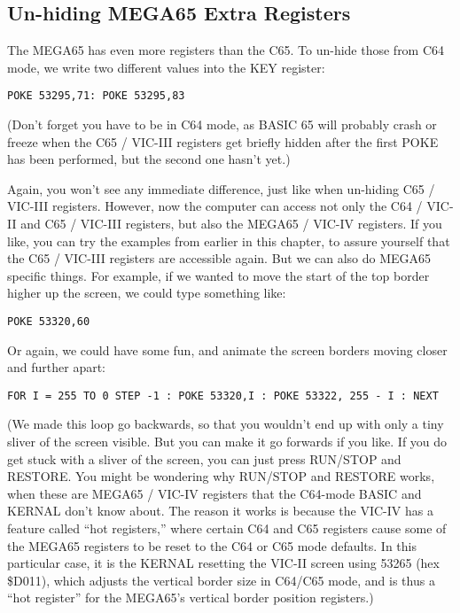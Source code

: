 \subsection{Un-hiding MEGA65 Extra Registers}

The MEGA65 has even more registers than the C65.  To un-hide those from C64 mode, we write two different values into the KEY register:

\begin{tcolorbox}[colback=black,coltext=white]
\verbatimfont{\codefont}
\begin{verbatim}
POKE 53295,71: POKE 53295,83
\end{verbatim}
\end{tcolorbox}

(Don't forget you have to be in C64 mode, as BASIC 65 will probably crash or freeze when the C65 / VIC-III registers get briefly
hidden after the first POKE has been performed, but the second one hasn't yet.)

Again, you won't see any immediate difference, just like when un-hiding C65 / VIC-III registers.  However, now the computer
can access not only the C64 / VIC-II and C65 / VIC-III registers, but also the MEGA65 / VIC-IV registers.  If you like,
you can try the examples from earlier in this chapter, to assure yourself that the C65 / VIC-III registers are accessible again.
But we can also do MEGA65 specific things. For example, if we wanted to move
the start of the top border higher up the screen, we could type something like:

\begin{tcolorbox}[colback=black,coltext=white]
\verbatimfont{\codefont}
\begin{verbatim}
POKE 53320,60
\end{verbatim}
\end{tcolorbox}

Or again, we could have some fun, and animate the screen borders moving closer and further apart:

\begin{tcolorbox}[colback=black,coltext=white]
\verbatimfont{\codefont}
\begin{verbatim}
FOR I = 255 TO 0 STEP -1 : POKE 53320,I : POKE 53322, 255 - I : NEXT
\end{verbatim}
\end{tcolorbox}

(We made this loop go backwards, so that you wouldn't end up with only a tiny sliver of the
screen visible.  But you can make it go forwards if you like. If you do get stuck with a sliver
of the screen, you can just press RUN/STOP and RESTORE.  You might be wondering why RUN/STOP
and RESTORE works, when these are MEGA65 / VIC-IV registers that the C64-mode BASIC and KERNAL
don't know about.  The reason it works is because the VIC-IV has a feature called ``hot registers,''
where certain C64 and C65 registers cause some of the MEGA65 registers to be reset to the C64 or
C65 mode defaults. In this particular case, it is the KERNAL resetting the VIC-II screen using
53265 (hex \$D011), which adjusts the vertical border size in C64/C65 mode, and is thus a ``hot register''
for the MEGA65's vertical border position registers.)

